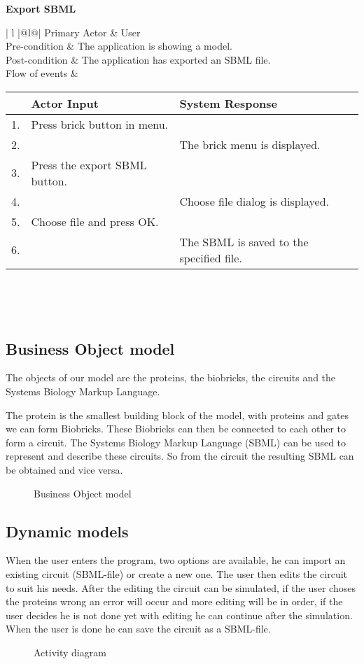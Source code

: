 \documentclass[a4paper]{article}
\begin{document}
{\bf Export SBML}\\
\begin{tabular}{ | l |@{}l@{}| } \hline
Primary Actor	& \; User \\  \hline
Pre-condition	& \; The application is showing a model. \\  \hline
Post-condition	& \; The application has exported an SBML file.	\\  \hline
Flow of events	& 
	\begin{tabular}{c | l | l}
	   & Actor Input 	& System Response 	\\  \hline
	1. & Press brick button in menu. &		\\  \hline
	2. & & The brick menu is displayed. 	\\  \hline
	3. & Press the export SBML button. &	\\  \hline
	4. & & Choose file dialog is displayed. \\  \hline
	5. & Choose file and press OK. &		\\  \hline
	6. & & The SBML is saved to the specified file. \\
	\end{tabular} \\ \hline
\end{tabular}\\

\pagebreak
\subsection{Business Object model} %
The objects of our model are the proteins, the biobricks, the circuits and the Systems Biology Markup Language.

The protein is the smallest building block of the model, with proteins and gates we can form Biobricks. These Biobricks can then be connected to each other to form a circuit. The Systems Biology Markup Language (SBML) can be used to represent and describe these circuits. So from the circuit the resulting SBML can be obtained and vice versa.
\begin{figure}[h!]
	\caption{Business Object model}
	\centering
\end{figure}

\subsection{Dynamic models}
When the user enters the program, two options are available, he can import an existing circuit (SBML-file) or create a new one. The user then edits the circuit to suit his needs. After the editing the circuit can be simulated, if the user choses the proteins wrong an error will occur and more editing will be in order, if the user decides he is not done yet with editing he can continue after the simulation. When the user is done he can save the circuit as a SBML-file.
\begin{figure}[h!]
	\label{fig-gui}	
	\caption{Activity diagram}
	\centering
\end{figure}
\pagebreak
\end{document}
